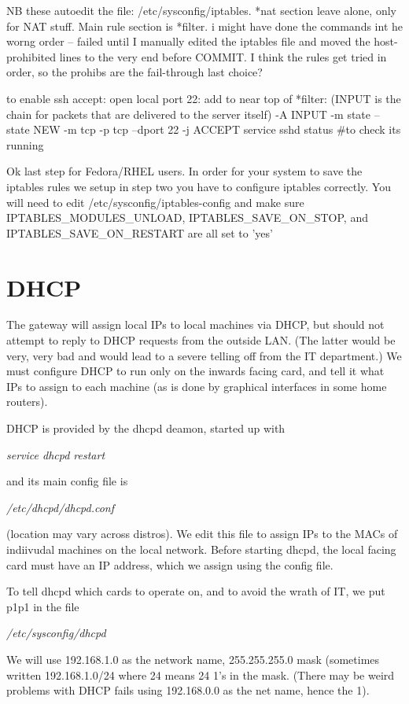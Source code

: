 \documentclass[oneside,english]{scrbook}
\begin{document}
NB these autoedit the file:  /etc/sysconfig/iptables.   *nat section leave alone, only for NAT stuff.   Main rule section is *filter.
    i might have done the commands int he worng order -- failed until I manually edited the iptables file and moved the host-prohibited lines to the very end before COMMIT.  I think the rules get tried in order, so the prohibs are the fail-through last choice?

to enable ssh accept: open local port 22: add to near top of *filter:   (INPUT is the chain for packets that are delivered to the server itself)
  -A INPUT -m state --state NEW -m tcp -p tcp --dport 22 -j ACCEPT
    service sshd status  #to check its running

Ok last step for Fedora/RHEL users. In order for your system to save the iptables rules we setup in step two you have to configure iptables correctly. You will need to edit /etc/sysconfig/iptables-config and make sure IPTABLES_MODULES_UNLOAD, IPTABLES_SAVE_ON_STOP, and IPTABLES_SAVE_ON_RESTART are all set to 'yes'


\section{DHCP}

The gateway will assign local IPs to local machines via DHCP, but
should not attempt to reply to DHCP requests from the outside LAN.
(The latter would be very, very bad and would lead to a severe telling
off from the IT department.) We must configure DHCP to run only on
the inwards facing card, and tell it what IPs to assign to each machine
(as is done by graphical interfaces in some home routers).

DHCP is provided by the dhcpd deamon, started up with

\emph{service dhcpd restart}

and its main config file is

\emph{/etc/dhcpd/dhcpd.conf}

(location may vary across distros). We edit this file to assign IPs
to the MACs of indiivudal machines on the local network. Before starting
dhcpd, the local facing card must have an IP address, which we assign
using the config file.

To tell dhcpd which cards to operate on, and to avoid the wrath of
IT, we put p1p1 in the file

\emph{/etc/sysconfig/dhcpd}

We will use 192.168.1.0 as the network name, 255.255.255.0 mask (sometimes
written 192.168.1.0/24 where 24 means 24 1's in the mask. (There may
be weird problems with DHCP fails using 192.168.0.0 as the net name,
hence the 1).
\end{document}

